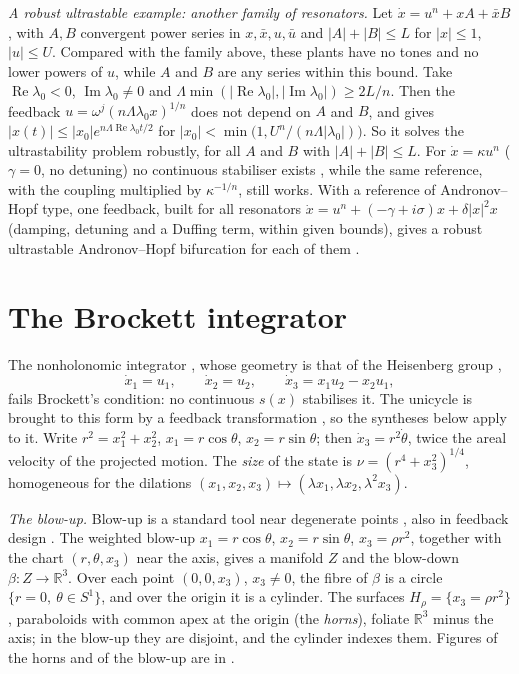 \documentclass[11pt,reqno]{amsart}
\theoremstyle{plain}
\theoremstyle{remark}
\theoremstyle{definition}
\newcommand{\R}{\mathbb{R}}
\begin{document}
\emph{A robust ultrastable example: another family of resonators.} Let $\dot x=u^{n}+xA+\bar xB$, with $A,B$ convergent power series in $x,\bar x,u,\bar u$ and $|A|+|B|\le L$ for $|x|\le1$, $|u|\le U$. Compared with the family above, these plants have no tones and no lower powers of $u$, while $A$ and $B$ are any series within this bound. Take $\operatorname{Re}\lambda_0<0$, $\operatorname{Im}\lambda_0\ne0$ and $\Lambda\min(|\operatorname{Re}\lambda_0|,|\operatorname{Im}\lambda_0|)\ge2L/n$. Then the feedback $u=\omega^{j}(n\Lambda\lambda_0x)^{1/n}$ does not depend on $A$ and $B$, and gives $|x(t)|\le|x_0|e^{n\Lambda\operatorname{Re}\lambda_0t/2}$ for $|x_0|<\min\bigl(1,U^{n}/(n\Lambda|\lambda_0|)\bigr)$. So it solves the ultrastability problem robustly, for all $A$ and $B$ with $|A|+|B|\le L$. For $\dot x=\kappa u^{n}$ ($\gamma=0$, no detuning) no continuous stabiliser exists \cite[\S3.2]{Companion}, while the same reference, with the coupling multiplied by $\kappa^{-1/n}$, still works. With a reference of Andronov--Hopf type, one feedback, built for all resonators $\dot x=u^{n}+(-\gamma+i\sigma)x+\delta|x|^{2}x$ (damping, detuning and a Duffing term, within given bounds), gives a robust ultrastable Andronov--Hopf bifurcation for each of them \cite[\S3.4]{Companion}.

\section{The Brockett integrator}\label{sec:brockett}

The nonholonomic integrator \cite{Brockett1983}, whose geometry is that of the Heisenberg group \cite{AgrachevBarilariBoscain2019},
\begin{equation}\label{eq:brockett}
  \dot x_1=u_1,\qquad \dot x_2=u_2,\qquad \dot x_3=x_1u_2-x_2u_1,
\end{equation}
fails Brockett's condition: no continuous $s(x)$ stabilises it. The unicycle is brought to this form by a feedback transformation \cite{SontagSurvey1999}, so the syntheses below apply to it. Write $r^{2}=x_1^{2}+x_2^{2}$, $x_1=r\cos\theta$,
$x_2=r\sin\theta$; then $\dot x_3=r^{2}\dot\theta$, twice the areal velocity of the projected motion. The \emph{size}
of the state is $\nu=(r^{4}+x_3^{2})^{1/4}$, homogeneous for the dilations
$(x_1,x_2,x_3)\mapsto(\lambda x_1,\lambda x_2,\lambda^{2}x_3)$.

\emph{The blow-up.} Blow-up is a standard tool near degenerate points \cite{JardonKuehn2021}, also in feedback design
\cite{JardonScherpenPuerto2019}. The weighted blow-up $x_1=r\cos\theta$, $x_2=r\sin\theta$, $x_3=\rho r^{2}$, together with the
chart $(r,\theta,x_3)$ near the axis, gives a manifold $Z$ and the blow-down $\beta\colon Z\to\R^{3}$. Over each point
$(0,0,x_3)$, $x_3\ne0$, the fibre of $\beta$ is a circle $\{r=0,\ \theta\in S^{1}\}$, and over the origin it is a
cylinder. The surfaces $H_\rho=\{x_3=\rho r^{2}\}$, paraboloids with common apex at the origin (the \emph{horns}),
foliate $\R^{3}$ minus the axis; in the blow-up they are disjoint, and the cylinder indexes them. Figures of the horns and of the blow-up are in \cite[\S4.1]{Companion}.
\end{document}
